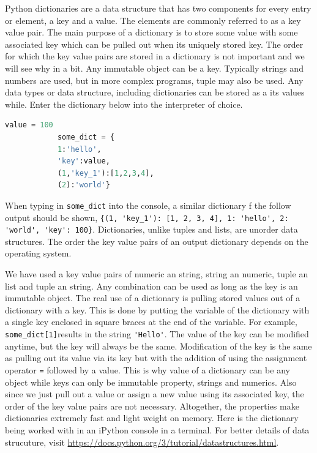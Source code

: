 \documentclass[11pt,a4paper]{book}
\begin{document}
			Python dictionaries are a data structure that has two components for every entry or element, a key and a value. The elements are commonly referred to as a key value pair. The main purpose of a dictionary is to store some value with some associated key which can be pulled out when its uniquely stored key. The order for which the key value pairs are stored in a dictionary is not important and we will see why in a bit. Any immutable object can be a key. Typically strings and numbers are used, but in more complex programs, tuple may also be used. Any data types or data structure, including dictionaries can be stored as a its values while. Enter the dictionary below into the interpreter of choice. 
			
			\begin{lstlisting}[language=Python, caption = Some dictionary that is created]
			value = 100
			some_dict = {
			1:'hello',
			'key':value,
			(1,'key_1'):[1,2,3,4],
			(2):'world'}
			\end{lstlisting}			
			
			When typing in \lstinline|some_dict| into the console, a similar  dictionary f the follow output should be shown, \lstinline|{(1, 'key_1'): [1, 2, 3, 4], 1: 'hello', 2: 'world', 'key': 100}|. Dictionaries, unlike tuples and lists, are unorder data structures. The order the key value pairs of an output dictionary depends on the operating system. 
			
			We have used a key value pairs of numeric an string, string an numeric, tuple an list and tuple an string. Any combination can be used as long as the key is an immutable object. The real use of a dictionary is pulling stored values out of a dictionary with a key. This is done by putting the variable of the dictionary with a single key enclosed in square braces at the end of the variable. For example, \lstinline|some_dict[1]|results in the string \lstinline|'Hello'|. The value of the key can be modified anytime, but the key will always be the same. Modification of the key is the same as pulling out its value via its key but with the addition of using the assignment operator \lstinline|=| followed by a value. This is why value of a dictionary can be any object while keys can only be immutable property, strings and numerics. Also since we just pull out a value or assign a new value using its associated key, the order of the key value pairs are not necessary. Altogether, the properties make dictionaries extremely fast and light weight on memory. Here is the dictionary being worked with in an iPython console in a terminal. 		For better details of data strucuture, visit \url{https://docs.python.org/3/tutorial/datastructures.html}.
			
\end{document}
